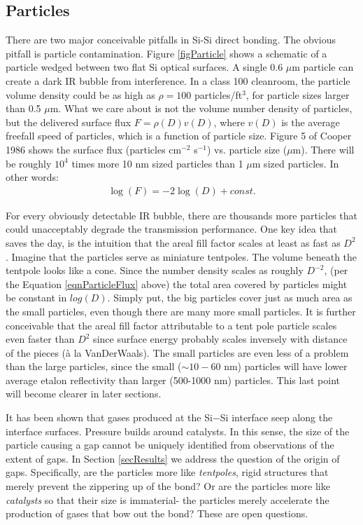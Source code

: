 \documentclass[osajnl,preprint,showpacs,superscriptaddress,12pt]{revtex4-1} %
\begin{document}
\subsection{Particles}

There are two major conceivable pitfalls in Si-Si direct bonding.  The obvious pitfall is particle contamination.  Figure \ref{figParticle} shows a schematic of a particle wedged between two flat Si optical surfaces.  A single 0.6 $\mu$m particle can create a dark IR bubble from interference.  In a class 100 cleanroom, the particle volume density could be as high as $\rho=100$ particles/ft$^3$, for particle sizes larger than 0.5 $\mu$m.  What we care about is not the volume number density of particles, but the delivered surface flux $F=\rho(D) v(D)$, where $v(D)$ is the average freefall speed of particles, which is a function of particle size.  Figure 5 of Cooper 1986\cite{doi:10.1080/02786828608959094} shows the surface flux (particles cm$^{-2}$ s$^{-1}$) vs. particle size ($\mu$m).  There will be roughly $10^4$ times more 10 nm sized particles than 1 $\mu$m sized particles.  In other words:
\begin{eqnarray}
\log(F) = -2\log(D) + const. \label{eqnParticleFlux}
\end{eqnarray}

For every obviously detectable IR bubble, there are thousands more particles that could unacceptably degrade the transmission performance.  One key idea that saves the day, is the intuition that the areal fill factor scales at least as fast as $D^2$.  Imagine that the particles serve as miniature tentpoles.  The volume beneath the tentpole looks like a cone.  Since the number density scales as roughly $D^{-2}$, (per the Equation \ref{eqnParticleFlux} above) the total area covered by particles might be constant in $log(D)$.  Simply put, the big particles cover just as much area as the small particles, even though there are many more small particles.  It is further conceivable that the areal fill factor attributable to a tent pole particle scales even faster than $D^2$ since surface energy probably scales inversely with distance of the pieces (\`a la VanDerWaals).  The small particles are even less of a problem than the large particles, since the small ($\sim10-60$ nm) particles will have lower average etalon reflectivity than larger (500-1000 nm) particles.  This last point will become clearer in later sections.

It has been shown\cite{1992JEMat..21..669M} that gases produced at the Si$-$Si interface seep along the interface surfaces.  Pressure builds around catalysts.  In this sense, the size of the particle causing a gap cannot be uniquely identified from observations of the extent of gaps.  In Section \ref{secResults} we address the question of the origin of gaps.  Specifically, are the particles more like \emph{tentpoles}, rigid structures that merely prevent the zippering up of the bond?  Or are the particles more like \emph{catalysts} so that their size is immaterial- the particles merely accelerate the production of gases that bow out the bond?  These are open questions.
\end{document}
